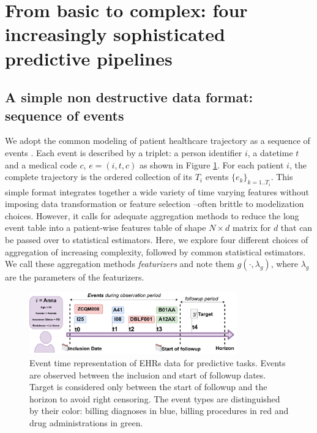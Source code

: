 \documentclass[french,12pt,twoside,a4paper]{book}
\begin{document}


\section{From basic to complex: four increasingly sophisticated predictive pipelines}%
\label{sec:predictive_models:pipelines}%

\subsection{A simple non destructive data format: sequence of events}%
\label{subsec:predictive_models:event_format}%
We adopt the common modeling of patient healthcare trajectory as a sequence of
events \citep{beam2019clinical, bacry2020scalpel3, chazard2022book}. Each event
is described by a triplet: a person identifier $i$, a datetime $t$ and a medical
code $c$, $e = (i, t, c)$ as shown in Figure \ref{fig:ehr_prediction_timeline}.
For each patient $i$, the complete trajectory is the ordered collection of its
$T_i$ events $\{e_k\}_{k=1..T_i}$. This simple format integrates together a wide
variety of time varying features without imposing data transformation or feature
selection --often brittle to modelization choices. However, it calls for
adequate aggregation methods to reduce the long event table into a patient-wise
features table of shape $N \times d$ matrix for $d$  that can be passed over to
statistical estimators.
Here, we explore four different choices of aggregation of increasing
complexity, followed by common statistical estimators. We call these aggregation
methods \emph{featurizers} and note them $g(\cdot, \lambda_g)$, where
$\lambda_g$ are the parameters of the featurizers.

\begin{figure}
  \centering
  \includegraphics[width=0.8\textwidth]{img/chapter_3/ehr_trajectory_predictive.pdf}
  \caption{Event time representation of EHRs data for predictive tasks. Events
    are observed between the inclusion and start of followup dates. Target is
    considered only between the start of followup and the horizon to avoid right
    censoring. The event types are distinguished by their color: billing
    diagnoses in blue, billing procedures in red and drug administrations in
    green.}\label{fig:ehr_prediction_timeline}
\end{figure}
\end{document}
